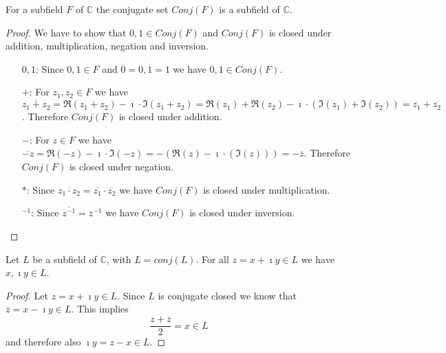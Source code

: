 \begin{lemma}
    \label{lem:ConjClosed.conj_field}
    \leanok
    For a subfield $F$  of $\mathbb{C}$ the conjugate set $Conj(F)$ is a subfield of $\mathbb{C}$.
\end{lemma}
\begin{proof}
    \leanok
    We have to show that $0,1 \in Conj(F)$ and $Conj(F)$ is closed under addition, multiplication, negation and inversion.
    \begin{itemize}
        \item [$0,1$:] Since $0,1 \in F$ and $\overline{0} = 0, \overline{1} = 1$ we have $0,1 \in Conj(F)$.
        \item [$+$:] For $z_1,z_2 \in F$ we have $\overline{z_1 + z_2} =  \Re(z_1 + z_2)  - \imath\cdot \Im(z_1 + z_2) = \Re(z_1) + \Re(z_2) - \imath\cdot (\Im(z_1) + \Im(z_2)) = \overline{z_1} + \overline{z_2}$. Therefore $Conj(F)$ is closed under addition.
        \item [$-$:] For $z \in F$ we have $\overline{-z} = \Re(-z) - \imath\cdot \Im(-z) = -(\Re(z) - \imath\cdot (\Im(z))) = -\overline{z}$. Therefore $Conj(F)$ is closed under negation.
        \item [$*$:] Since $\overline{z_1 \cdot z_2} = \overline{z_1} \cdot \overline{z_2}$ we have $Conj(F)$ is closed under multiplication.
        \item [$^{-1}$:] Since $\overline{z^{-1}} = \overline{z}^{-1}$ we have $Conj(F)$ is closed under inversion.
    \end{itemize}
\end{proof}

\begin{lemma}
    \label{lem:ConjClosed.re_im_in_L}
    \leanok
    Let $L$ be a subfield of $\mathbb{C}$, with $L = conj(L)$. For all $z = x + \imath y \in L$ we have $x, \imath y \in L$.
\end{lemma}
\begin{proof}
    \leanok
    Let $z = x + \imath y \in L$. Since $L$ is conjugate closed we know that $\overline{z}=x-\imath y \in L$. This implies
    \begin{equation*}
        \frac{z + \overline{z}}{2} = x \in L
    \end{equation*}
    and therefore also $\imath y = z - x \in L$.
\end{proof}


